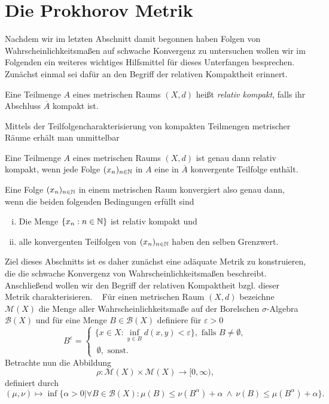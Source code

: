\section{Die Prokhorov Metrik}
Nachdem wir im letzten Abschnitt damit begonnen haben Folgen von Wahrscheinlichkeitsmaßen auf schwache Konvergenz zu untersuchen wollen wir im Folgenden ein weiteres wichtiges Hilfsmittel für dieses Unterfangen besprechen.
Zunächst einmal sei dafür an den Begriff der relativen Kompaktheit erinnert. 
\begin{mydef}
    Eine Teilmenge $A$ eines metrischen Raums $(X,d)$ heißt \textit{relativ kompakt}, falls ihr Abschluss $\overline{A}$ kompakt ist. 
\end{mydef}
Mittels der Teilfolgencharakterisierung von kompakten Teilmengen metrischer Räume erhält man unmittelbar

\begin{proposition}
    Eine Teilmenge $A$ eines metrischen Raums $(X,d)$ ist genau dann relativ kompakt, wenn jede Folge $(x_n)_{n \in \mathbb{N}}$ in $A$ eine in $\overline{A}$ konvergente Teilfolge enthält.
\end{proposition}
Eine Folge $(x_n)_{n \in \mathbb{N}}$ in einem metrischen Raum konvergiert also genau dann, wenn die beiden folgenden Bedingungen erfüllt sind
\begin{enumerate}[(i)]
    \item Die Menge $\{x_n : n \in \mathbb{N} \}$ ist relativ kompakt und
    \item alle konvergenten Teilfolgen von $(x_n)_{n \in \mathbb{N}}$ haben den selben Grenzwert. 
\end{enumerate}

Ziel dieses Abschnitts ist es daher zunächst eine adäquate Metrik zu konstruieren, die die schwache Konvergenz von Wahrscheinlichkeitsmaßen beschreibt. 
Anschließend wollen wir den Begriff der relativen Kompaktheit bzgl. dieser Metrik charakterisieren. 
\newline \ \newline
Für einen metrischen Raum $(X,d)$ bezeichne $\mathcal{M}(X)$ die Menge aller Wahrscheinlichkeitsmaße auf der Borelschen $\sigma$-Algebra $\mathcal{B}(X)$ und für eine Menge $B \in \mathcal{B}(X)$ definiere für $\varepsilon > 0$
$$
    B^{\varepsilon} = \begin{cases}
         \{x \in X: \inf_{y \in B}d(x,y) < \varepsilon\}, \text{ falls } B \neq \emptyset, \\\ 
        \emptyset, \text{ sonst.}
    \end{cases}
$$
Betrachte nun die Abbildung 
$$
    \rho: \mathcal{M}(X) \times \mathcal{M}(X) \to [0, \infty),
$$
definiert durch
$$
    (\mu, \nu) \mapsto \inf\{\alpha > 0 | \forall B \in \mathcal{B}(X): \mu(B) \leq \nu(B^{\alpha}) + \alpha \ \land \ \nu(B) \leq \mu(B^{\alpha}) + \alpha \}.
$$

